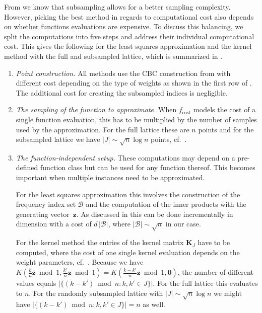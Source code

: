 \documentclass[a4paper]{amsart}
\newcommand{\modone}{\bmod{}1}
\begin{document}
From  we know that subsampling allows for a better sampling complexity.
However, picking the best method in regards to computational cost also depends on whether functions evaluations are expensive.
To discuss this balancing, we split the computations into five steps and address their individual computational cost.
This gives the following for the least squares approximation and the kernel method with the full and subsampled lattice, which is summarized in .
\begin{enumerate}
\item
    \emph{Point construction.}
    All methods use the CBC construction from \cite{GS25} with different cost depending on the type of weights as shown in the first row of .
    The additional cost for creating the subsampled indices is negligible.

\item
    \emph{The sampling of the function to approximate.}
    When $f_{\text{cost}}$ models the cost of a single function evaluation, this has to be multiplied by the number of samples used by the approximation.
    For the full lattice these are $n$ points and for the subsampled lattice we have $|J| \sim \sqrt{n}\log n$ points, cf.~.

\item
    \emph{The function-independent setup.}
    These computations may depend on a pre-defined function class but can be used for any function thereof.
    This becomes important when multiple instances need to be approximated.

    For the least squares approximation this involves the construction of the frequency index set $\mathcal B$ and the computation of the inner products with the generating vector~$\bm z$.
    As discussed in  this can be done incrementally in dimension with a cost of $d\,|\mathcal B|$, where $|\mathcal B| \sim \sqrt{n}$ in our case.

    For the kernel method the entries of the kernel matrix $\bm K_{J}$ have to be computed, where the cost of one single kernel evaluation depends on the weight parameters, cf.~\cite[Table~1]{KKKNS21}.
        Because we have $K(\frac kn \bm z\modone,\frac{k'}{n}\bm z\modone) = K(\frac{k-k'}{n}\bm z\modone, \bm 0)$, the number of different values equals $|\{(k-k') \bmod n : k,k'\in J\}|$.
    For the full lattice this evaluates to $n$.
    For the randomly subsampled lattice with $|J|\sim\sqrt n\log n$ we might have $|\{(k-k') \bmod n : k,k'\in J\}| = n$ as well.



\end{enumerate}
\end{document}
